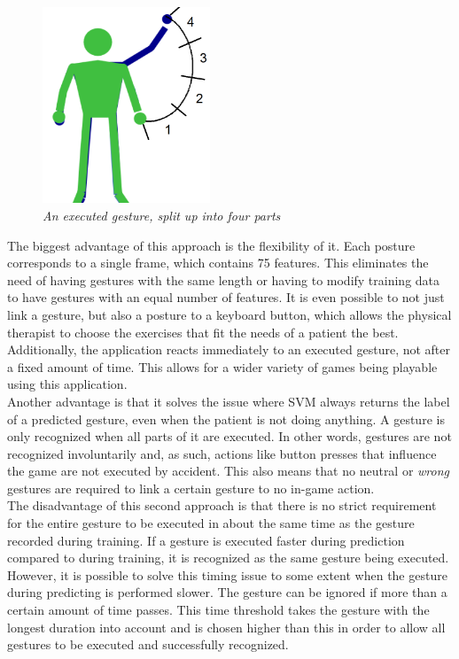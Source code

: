 \begin{figure}[H]
\begin{center}
\includegraphics[width=5cm]{SVMGesture.png}
\caption{\emph{An executed gesture, split up into four parts}}
\label{fig: gesture_split}
\end{center}
\end{figure}

The biggest advantage of this approach is the flexibility of it. Each posture corresponds to a single frame, which contains 75 features. This eliminates the need of having gestures with the same length or having to modify training data to have gestures with an equal number of features. It is even possible to not just link a gesture, but also a posture to a keyboard button, which allows the physical therapist to choose the exercises that fit the needs of a patient the best. Additionally, the application reacts immediately to an executed gesture, not after a fixed amount of time. This allows for a wider variety of games being playable using this application.\\

Another advantage is that it solves the issue where SVM always returns the label of a predicted gesture, even when the patient is not doing anything. A gesture is only recognized when all parts of it are executed. In other words, gestures are not recognized involuntarily and, as such, actions like button presses that influence the game are not executed by accident. This also means that no neutral or \emph{wrong} gestures are required to link a certain gesture to no in-game action.\\ %

The disadvantage of this second approach is that there is no strict requirement for the entire gesture to be executed in about the same time as the gesture recorded during training. If a gesture is executed faster during prediction compared to during training, it is recognized as the same gesture being executed. However, it is possible to solve this timing issue to some extent when the gesture during predicting is performed slower. The gesture can be ignored if more than a certain amount of time passes. This time threshold takes the gesture with the longest duration into account and is chosen higher than this in order to allow all gestures to be executed and successfully recognized.